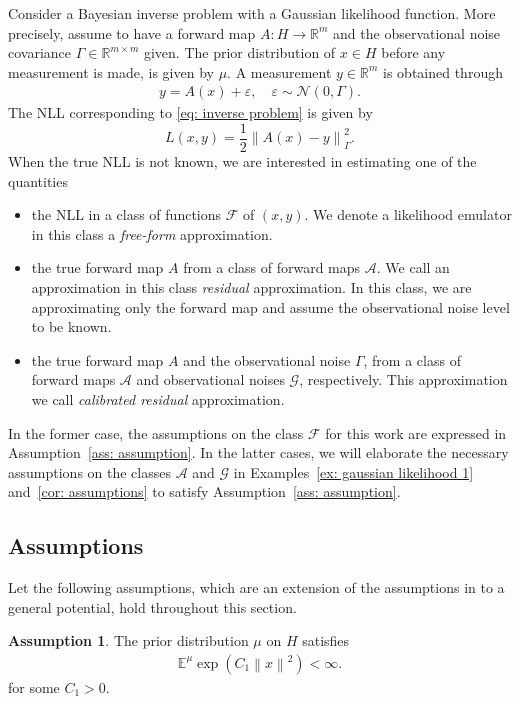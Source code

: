 \documentclass{amsart}
\theoremstyle{definition}
\newtheorem{assumption}{Assumption}
\newcommand{\E}{{\mathbb E}}
\newcommand{\R}{{\mathbb R}}
\newcommand{\norm}[1]{\left\|#1\right\|}
\newcommand{\N}{\mathcal{N}}
\newcommand{\F}{\mathcal{F}}
\begin{document}
Consider a Bayesian inverse problem with a Gaussian likelihood function.
More precisely, assume to have a forward map $A: H \rightarrow \R^m$ and the observational noise covariance $\Gamma \in \R^{m \times m}$ given. The prior distribution of $x \in H$ before any measurement is made, is given by $\mu$. A measurement $y \in \R^m$ is obtained through
\begin{eqnarray}\label{eq: inverse problem}
    y = A(x) +  \varepsilon, \quad \varepsilon \sim \N(0, \Gamma).
\end{eqnarray}
The NLL corresponding to \eqref{eq: inverse problem} is given by
\begin{equation*}
        L(x, y) = \frac{1}{2} \norm{A(x) - y}_\Gamma^2.
\end{equation*}
When the true NLL is not known, we are interested in estimating one of the quantities
\begin{itemize}
    \item the NLL in a class of functions $\F$ of $(x, y)$. We denote a likelihood emulator in this class a \emph{free-form} approximation.
    \item the true forward map $A$ from a class of forward maps $\mathcal{A}$. We call an approximation in this class \emph{residual} approximation. In this class, we are approximating only the forward map and assume the observational noise level to be known.
    \item the true forward map $A$ and the observational noise $\Gamma$, from a class of forward maps $\mathcal{A}$ and observational noises $\mathcal{G}$, respectively. This approximation we call \emph{calibrated residual} approximation.
\end{itemize}
In the former case, the assumptions on the class $\F$ for this work are expressed in Assumption~\ref{ass: assumption}. In the latter cases, we will elaborate the necessary assumptions on the classes $\mathcal{A}$ and $\mathcal{G}$ in Examples~\ref{ex: gaussian likelihood 1} and~\ref{cor: assumptions} to satisfy Assumption~\ref{ass: assumption}.

\subsection{Assumptions}
Let the following assumptions, which are an extension of the assumptions in \cite{helin2025bayesianoptimalexperimentaldesign} to a general potential, hold throughout this section. 
\begin{assumption}
    \label{ass: prior}
    The prior distribution $\mu$ on $H$ satisfies 
    \begin{eqnarray}\label{eq: sub gaussian prior}
        \E^{\mu} \exp(C_1 \norm{x}^2) < \infty.
    \end{eqnarray}
    for some $C_1>0$.
\end{assumption}
\end{document}
